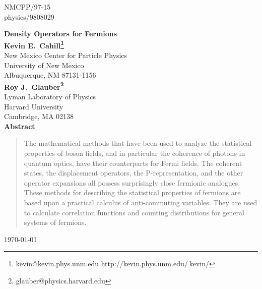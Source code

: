 \documentclass[12pt]{article}
\begin{document}
\pagestyle{empty}
\begin{flushright}
NMCPP/97-15\\
physics/9808029\\
\end{flushright}
\begin{center}
{\bf\Large Density Operators for Fermions}\\
\vspace*{1.0cm}
{\bf Kevin E.~Cahill\footnote{kevin@kevin.phys.unm.edu
 http://kevin.phys.unm.edu/$\tilde{\ }$kevin/}}\\
\vspace{.2cm}
New Mexico Center for Particle Physics\\
University of New Mexico\\
Albuquerque, NM 87131-1156\\
\vspace{.50cm}
{\bf Roy J.~Glauber\footnote{glauber@physics.harvard.edu}}\\
\vspace{.2cm}
Lyman Laboratory of Physics\\
Harvard University\\
Cambridge, MA 02138\\
\vspace*{1.0cm}
{\bf Abstract}
\end{center}
\begin{quote}
The mathematical methods that have been
used to analyze the statistical properties
of boson fields, and in particular the 
coherence of photons in quantum optics, 
have their counterparts for Fermi fields.
The coherent states, the displacement operators,
the P-representation, and the other operator
expansions all possess surprisingly close 
fermionic analogues. 
These methods for describing the
statistical properties of fermions 
are based upon a practical calculus of anti-commuting variables. 
They are used to calculate correlation functions
and counting distributions 
for general systems of fermions.
\end{quote}
\vfill
\begin{flushleft}
\today\\
\end{flushleft}
\vfill\eject
\centerline{}
\vfill\eject

\setcounter{equation}{0}
\setcounter{page}{1}
\pagestyle{plain}
\end{document}
